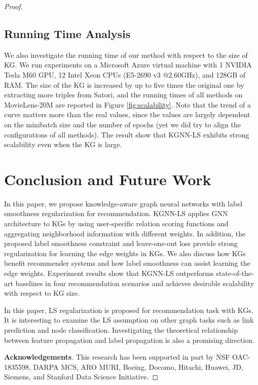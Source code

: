 \documentclass[sigconf]{acmart}
\begin{document}
\begin{proof}
		
	\subsection{Running Time Analysis}
		We also investigate the running time of our method with respect to the size of KG.
		We run experiments on a Microsoft Azure virtual machine with 1 NVIDIA Tesla M60 GPU, 12 Intel Xeon CPUs (E5-2690 v3 @2.60GHz), and 128GB of RAM.
		The size of the KG is increased by up to five times the original one by extracting more triples from Satori, and the running times of all methods on MovieLens-20M are reported in Figure \ref{fig:scalability}.
		Note that the trend of a curve matters more than the real values, since the values are largely dependent on the minibatch size and the number of epochs (yet we did try to align the configurations of all methods).
The result show that KGNN-LS exhibits strong scalability even when the KG is large.

			
	
\section{Conclusion and Future Work}
	In this paper, we propose knowledge-aware graph neural networks with label smoothness regularization for recommendation.
	KGNN-LS applies GNN architecture to KGs by using user-specific relation scoring functions and aggregating neighborhood information with different weights.	In addition, the proposed label smoothness constraint and leave-one-out loss provide strong regularization for learning the edge weights in KGs.
	We also discuss how KGs benefit recommender systems and how label smoothness can assist learning the edge weights.
	Experiment results show that KGNN-LS outperforms state-of-the-art baselines in four recommendation scenarios and achieves desirable scalability with respect to KG size.
	
	In this paper, LS regularization is proposed for recommendation task with KGs.
	It is interesting to examine the LS assumption on other graph tasks such as link prediction and node classification.
	Investigating the theoretical relationship between feature propagation and label propagation is also a promising direction.
	
	
\vspace{1em}
\noindent \textbf{Acknowledgements}.
This research has been supported in part by NSF OAC-1835598, DARPA MCS, ARO MURI, Boeing, Docomo, Hitachi, Huawei, JD, Siemens, and Stanford Data Science Initiative.



\end{proof}
\end{document}

